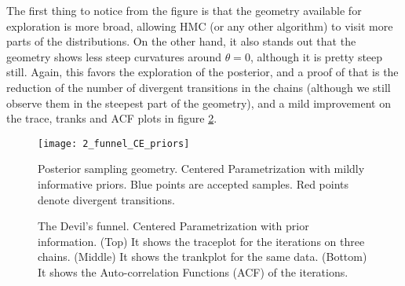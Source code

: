 The first thing to notice from the figure is that the geometry available for exploration is more broad, allowing HMC (or any other algorithm) to visit more parts of the distributions. On the other hand, it also stands out that the geometry shows less steep curvatures around $\theta=0$, although it is pretty steep still. Again, this favors the exploration of the posterior, and a proof of that is the reduction of the number of divergent transitions in the chains (although we still observe them in the steepest part of the geometry), and a mild improvement on the trace, tranks and ACF plots in figure \ref{fig:devil_prior}.
%
\begin{figure}[h]
	\centering
	\texttt{[image: 2\_funnel\_CE\_priors]}
	\caption[Posterior sampling geometry. Centered Parametrization with mildly informative priors.]%
	{Posterior sampling geometry. Centered Parametrization with mildly informative priors. Blue points are accepted samples. Red points denote divergent transitions.}
	\label{fig:devil_prior_geom}
\end{figure}
%
\begin{figure}[h] 
	\centering
	\begin{subfigure}
		\texttt{[image: 2\_trace\_CE\_priors]}
	\end{subfigure}
	\begin{subfigure}
		\texttt{[image: 2\_trank\_CE\_priors]}
	\end{subfigure}
	\begin{subfigure}
		\texttt{[image: 2\_acf\_CE\_priors]}
	\end{subfigure}
	\caption[The Devil's funnel. Centered Parametrization with prior information.]%
	{The Devil's funnel. Centered Parametrization with prior information. (Top) It shows the traceplot for the iterations on three chains. (Middle) It shows the trankplot for the same data. (Bottom) It shows the Auto-correlation Functions (ACF) of the iterations.}
	\label{fig:devil_prior}
\end{figure}


